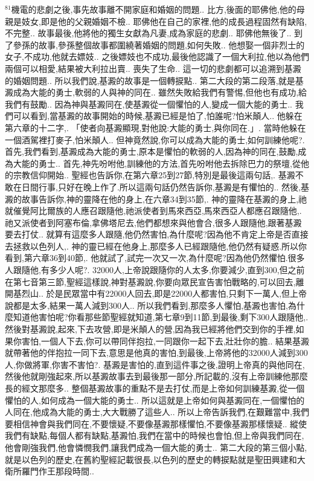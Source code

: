 \documentclass{book}
\begin{document}
$^{81}$機電的悲劇之後,事先故事離不開家庭和婚姻的問題..
比方,後面的耶佛他,他的母親是妓女,即是他的父親婚姻不檢..
耶佛他在自己的家裡,他的成長過程固然有缺陷,不完整..
故事最後,他將他的獨生女獻為凡妻,成為家庭的悲劇..
耶佛他無後了..
到了參孫的故事,參孫整個故事都圍繞著婚姻的問題,如何失敗..
他想娶一個非烈士的女子,不成功,他就去嫖妓..
之後嫖妓也不成功,最後他認識了一個大利拉,他以為他們兩個可以相愛,結果被大利拉出賣..
喪失了生命..
這一切的悲劇都可以追溯到基澱的婚姻問題..
所以我們說,基澱的故事是一個轉捩點..
第二大段的第二段落,就是基澱成為大能的勇士,軟弱的人與神的同在..
雖然失敗給我們有警惕,但他也有成功,給我們有鼓勵..
因為神與基澱同在,使基澱從一個懼怕的人,變成一個大能的勇士..
我們可以看到,當基澱的故事開始的時候,基澱已經是怕了,怕誰呢?怕米顛人..
他躲在第六章的十二字,.
「使者向基澱顯現,對他說:大能的勇士,與你同在.」.
當時他躲在一個酒駕裡打麥子,怕米顛人..
但神竟然說,你可以成為大能的勇士,如何訓練他呢?.
首先,我們看到,基澱成為大能的勇士,原本是懼怕的軟弱的人,因為神的同在,鼓勵,成為大能的勇士..
首先,神先吩咐他,訓練他的方法,首先吩咐他去拆除巴力的祭壇,從他的宗教信仰開始..
聖經也告訴你,在第六章25到27節,特別是最後這兩句話,.
基澱不敢在日間行事,只好在晚上作了.所以這兩句話仍然告訴你,基澱是有懼怕的..
然後,基澱的故事告訴你,神的靈降在他的身上,在六章34到35節,.
神的靈降在基澱的身上,祂就催覺阿比爾族的人應召跟隨他,祂派使者到馬來西亞,馬來西亞人都應召跟隨他,.
祂又派使者到阿塞布倫,拿佛塔尼去,他們都想來與他會合,很多人跟隨他,跟著基澱要去打仗..
就算有這麼多人跟隨,他仍然害怕,為什麼呢?因為他不肯定上帝是否直接去拯救以色列人,.
神的靈已經在他身上,那麼多人已經跟隨他,他仍然有疑惑.所以你看到,第六章36到40節,.
他就試了,試完一次又一次,為什麼呢?因為他仍然懼怕.很多人跟隨他,有多少人呢?.
32000人,上帝說跟隨你的人太多,你要減少,直到300,但之前在第七音第三節,聖經這樣說,神對基澱說,你要向眾民宣告害怕戰略的,可以回去,離開基烈山..
於是民眾當中有22000人回去,即是22000人都害怕,只剩下一萬人,但上帝說都是太多,結果一萬人減到300人..
所以我們看到,那麼多人懼怕,基澱也害怕,為什麼知道他害怕呢?你看那些節聖經就知道,第七章9到11節,到最後,剩下300人跟隨他,.
然後對基澱說,起來,下去攻營,即是米顛人的營,因為我已經將他們交到你的手裡,如果你害怕,一個人下去,你可以帶同伴抱拉,一同跟你一起下去,壯壯你的膽..
結果基澱就帶著他的伴抱拉一同下去,意思是他真的害怕,到最後,上帝將他的32000人減到300人,你做將軍,你害不害怕?.
基澱是害怕的,直到這件事之後,證明上帝真的與他同在,然後他就剛強起來,所以基澱故事去到最後那一部分,所記載的,沒有上帝訓練他那麼長的經文那麼多..
整個基澱故事的重點不是去打仗,而是上帝如何訓練基澱,從一個懼怕的人,如何成為一個大能的勇士..
所以這就是上帝如何與基澱同在,一個懼怕的人同在,他成為大能的勇士,大大戰勝了這些人..
所以上帝告訴我們,在艱難當中,我們要相信神會與我們同在,不要懷疑,不要像基澱那樣懼怕,不要像基澱那樣懷疑..
縱使我們有缺點,每個人都有缺點,基澱怕,我們在當中的時候也會怕,但上帝與我們同在,他會剛強我們,他會憐憫我們,讓我們成為一個大能的勇士..
第二大段的第三個小點,就是以色列的歷史,在舊約聖經記載很長,以色列的歷史的轉捩點就是聖田興建和大衛所羅門作王那段時間..
\end{document}
